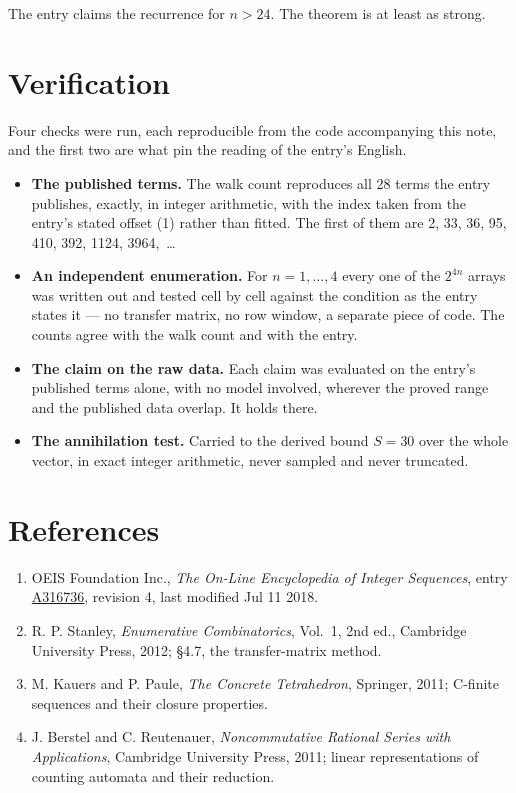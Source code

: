 \documentclass[11pt]{article}
\theoremstyle{definition}
\begin{document}
The entry claims the recurrence for $n > 24$. The theorem is at least as strong.

\section{Verification}

Four checks were run, each reproducible from the code accompanying this note, and the first two are what pin the reading of the entry's English.

\begin{itemize}

\item {\bfseries The published terms.} The walk count reproduces all 28 terms the entry publishes, exactly, in integer arithmetic, with the index taken from the entry's stated offset (1) rather than fitted. The first of them are 2, 33, 36, 95, 410, 392, 1124, 3964,~\dots

\item {\bfseries An independent enumeration.} For $n = 1,\dots,4$ every one of the $2^{4n}$ arrays was written out and tested cell by cell against the condition as the entry states it --- no transfer matrix, no row window, a separate piece of code. The counts agree with the walk count and with the entry.

\item {\bfseries The claim on the raw data.} Each claim was evaluated on the entry's published terms alone, with no model involved, wherever the proved range and the published data overlap. It holds there.

\item {\bfseries The annihilation test.} Carried to the derived bound $S = 30$ over the whole vector, in exact integer arithmetic, never sampled and never truncated.

\end{itemize}

\section{References}

\begin{enumerate}

\item OEIS Foundation Inc., \emph{The On-Line Encyclopedia of Integer Sequences}, entry \href{https://oeis.org/A316736}{A316736}, revision 4, last modified Jul 11 2018.

\item R. P. Stanley, \emph{Enumerative Combinatorics}, Vol.~1, 2nd ed., Cambridge University Press, 2012; \S4.7, the transfer-matrix method.

\item M. Kauers and P. Paule, \emph{The Concrete Tetrahedron}, Springer, 2011; C-finite sequences and their closure properties.

\item J. Berstel and C. Reutenauer, \emph{Noncommutative Rational Series with Applications}, Cambridge University Press, 2011; linear representations of counting automata and their reduction.

\end{enumerate}
\end{document}
